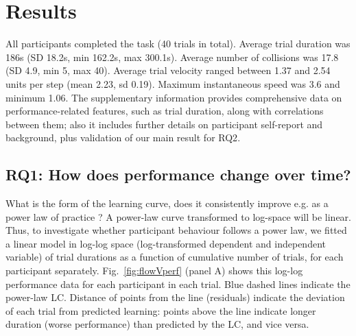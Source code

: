 \documentclass{frontierstyle/frontiersSCNS}
\begin{document}
\section{Results}

All participants completed the task (40 trials in total). Average trial duration was 186s (SD 18.2s, min 162.2s, max 300.1s). Average number of collisions was 17.8 (SD 4.9, min 5, max 40). Average trial velocity ranged between 1.37 and 2.54 units per step (mean 2.23, sd 0.19). Maximum instantaneous speed was 3.6 and minimum 1.06. The supplementary information provides comprehensive data on performance-related features, such as trial duration, along with correlations between them; also it includes further details on participant self-report and background, plus validation of our main result for {\sf RQ2}.


\subsection{RQ1: How does performance change over time?}

What is the form of the learning curve, does it consistently improve e.g. as a power law of practice \citep{Newell1982}? A power-law curve transformed to log-space will be linear. Thus, to investigate whether participant behaviour follows a power law, we fitted a linear model in log-log space (log-transformed dependent and independent variable) of trial durations as a function of cumulative number of trials, for each participant separately. Fig.~\ref{fig:flowVperf} (panel A) shows this log-log performance data for each participant in each trial. Blue dashed lines indicate the power-law LC. Distance of points from the line (residuals) indicate the deviation of each trial from predicted learning: points above the line indicate longer duration (worse performance) than predicted by the LC, and vice versa.
\end{document}
